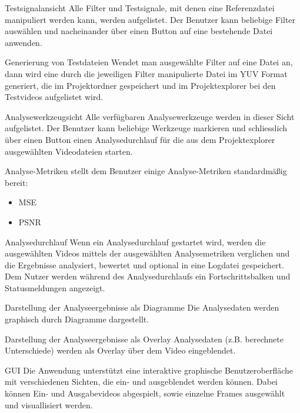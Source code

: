  Testsignalansicht
\newline
Alle Filter und Testsignale, mit denen eine Referenzdatei manipuliert werden kann, werden aufgelistet. Der Benutzer kann beliebige Filter auswählen und nacheinander über einen Button auf eine bestehende Datei anwenden.

 Generierung von Testdateien
\newline
Wendet man ausgewählte Filter auf eine Datei an, dann wird eine durch die jeweiligen Filter manipulierte Datei im YUV Format generiert, die im Projektordner gespeichert und im Projektexplorer bei den Testvideos aufgelistet wird.

 Analysewerkzeugsicht
\newline
Alle verfügbaren Analysewerkzeuge werden in dieser Sicht aufgelistet. Der Benutzer kann beliebige Werkzeuge markieren und schliesslich über einen Button einen Analysedurchlauf für die aus dem Projektexplorer ausgewählten Videodateien starten.

 Analyse-Metriken
\newline
\projektTitel stellt dem Benutzer einige Analyse-Metriken standardmäßig bereit:
\begin{itemize}
\item \gls{MSE}
\item \gls{PSNR}
\end{itemize}


 Analysedurchlauf
\newline
Wenn ein Analysedurchlauf gestartet wird, werden die ausgewählten Videos mittels der ausgewählten Analysemetriken verglichen und die Ergebnisse analysiert, bewertet und optional in eine Logdatei gespeichert. Dem Nutzer werden während des Analysedurchlaufs ein Fortschrittsbalken und Statusmeldungen angezeigt. 

 Darstellung der Analyseergebnisse als Diagramme
\newline
Die Analysedaten werden graphisch durch Diagramme dargestellt.

 Darstellung der Analyseergebnisse als Overlay
\newline
Analysedaten (z.B. berechnete Unterschiede) werden als Overlay über dem Video eingeblendet.


 GUI
\newline
Die Anwendung unterstützt eine interaktive graphische Benutzeroberfläche mit verschiedenen Sichten, die ein- und ausgeblendet werden können. Dabei können Ein- und Ausgabevideos abgespielt, sowie einzelne Frames ausgewählt und visuallisiert werden.





